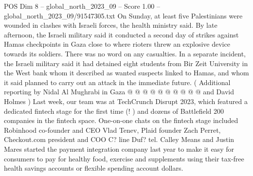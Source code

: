 \begin{textsample}{POS Dim 8 – global\_north\_2023\_09 – Score 1.00 – global\_north\_2023\_09/91547305.txt}
On Sunday, at least five Palestinians were wounded in clashes with Israeli forces, the health ministry said.
By late afternoon, the Israeli military said it conducted a second day of strikes against Hamas checkpoints in Gaza close to where rioters threw an explosive device towards its soldiers.
There was no word on any casualties.
In a separate incident, the Israeli military said it had detained eight students from Bir Zeit University in the West bank whom it described as wanted suspects linked to Hamas, and whom it said planned to carry out an attack in the immediate future. ( Additional reporting by Nidal Al Mughrabi in Gaza @ @ @ @ @ @ @ @ @ @ and David Holmes ) Last week, our team was at TechCrunch Disrupt 2023, which featured a dedicated fintech stage for the first time (! ) and dozens of Battlefield 200 companies in the fintech space.
One-on-one chats on the fintech stage included Robinhood co-founder and CEO Vlad Tenev, Plaid founder Zach Perret, Checkout.com president and COO C? line Duf? tel.
Calley Means and Justin Mares started the payment integration company last year to make it easy for consumers to pay for healthy food, exercise and supplements using their tax-free health savings accounts or flexible spending account dollars.

\end{textsample}
